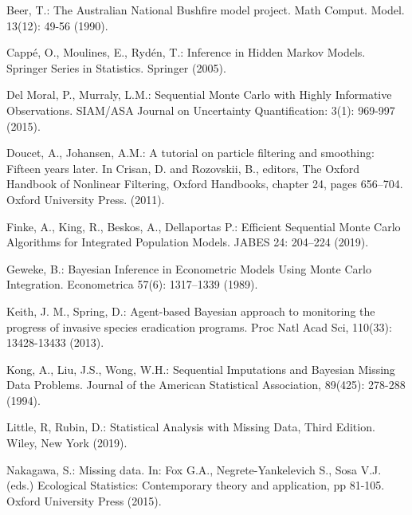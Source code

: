 \begin{thebibliography}{}

Beer, T.: The Australian National Bushfire model project. Math Comput. Model. 13(12): 49-56 (1990).

Capp\'{e}, O., Moulines, E., Ryd\'{e}n, T.: Inference in Hidden Markov Models. Springer Series in Statistics. Springer (2005).

Del Moral, P., Murraly, L.M.: Sequential Monte Carlo with Highly Informative Observations. SIAM/ASA Journal on Uncertainty Quantification: 3(1): 969-997 (2015).

Doucet, A., Johansen, A.M.: A tutorial on particle filtering and smoothing: Fifteen years later. In Crisan, D. and Rozovskii, B., editors, The Oxford Handbook of Nonlinear Filtering, Oxford Handbooks, chapter 24, pages 656–704. Oxford University Press. (2011).

Finke, A., King, R., Beskos, A., Dellaportas P.: Efficient Sequential Monte Carlo Algorithms for Integrated Population Models. JABES 24: 204–224 (2019).

Geweke, B.: Bayesian Inference in Econometric Models Using Monte Carlo Integration. Econometrica 57(6): 1317–1339 (1989).

 Keith, J. M., Spring, D.: Agent-based Bayesian approach to monitoring the progress of invasive species eradication programs. Proc Natl Acad Sci, 110(33): 13428-13433 (2013).

 Kong, A., Liu, J.S., Wong, W.H.: Sequential Imputations and Bayesian Missing Data Problems. Journal of the American Statistical Association, 89(425): 278-288 (1994).

 Little, R, Rubin, D.: Statistical Analysis with Missing Data, Third Edition. Wiley, New York (2019).

Nakagawa, S.: Missing data. In: Fox G.A., Negrete-Yankelevich S., Sosa V.J. (eds.) Ecological Statistics: Contemporary theory and application, pp 81-105. Oxford University Press (2015). 


\end{thebibliography}
